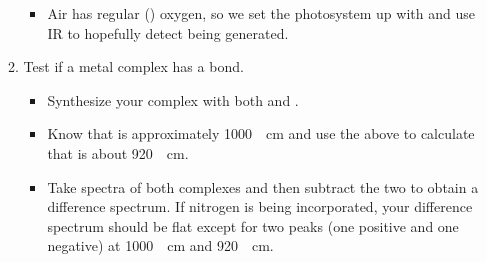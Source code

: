 \documentclass[../notes.tex]{subfiles}
\begin{document}
\begin{itemize}
\begin{enumerate}
        \begin{itemize}
            \item Air has regular () oxygen, so we set the photosystem up with  and use IR to hopefully detect  being generated.
        \end{itemize}
        \item Test if a metal complex has a  bond.
        \begin{itemize}
            \item Synthesize your complex with both  and .
            \item Know that  is approximately \SI{1000}{\per\centi\meter} and use the above to calculate that  is about \SI{920}{\per\centi\meter}.
            \item Take spectra of both complexes and then subtract the two to obtain a difference spectrum. If nitrogen is being incorporated, your difference spectrum should be flat except for two peaks (one positive and one negative) at \SI{1000}{\per\centi\meter} and \SI{920}{\per\centi\meter}.
        \end{itemize}
    \end{enumerate}
\end{itemize}
\end{document}
